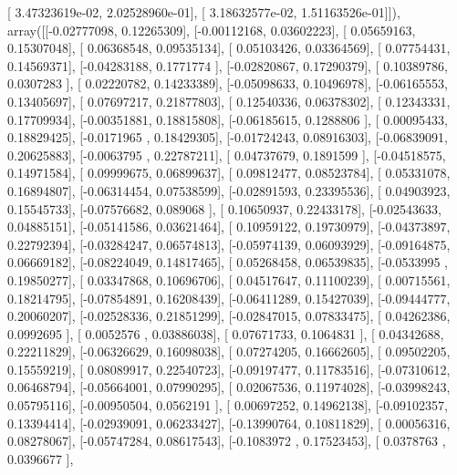 \documentclass{article}
\begin{document}
       [  3.47323619e-02,   2.02528960e-01],
       [  3.18632577e-02,   1.51163526e-01]]), array([[-0.02777098,  0.12265309],
       [-0.00112168,  0.03602223],
       [ 0.05659163,  0.15307048],
       [ 0.06368548,  0.09535134],
       [ 0.05103426,  0.03364569],
       [ 0.07754431,  0.14569371],
       [-0.04283188,  0.1771774 ],
       [-0.02820867,  0.17290379],
       [ 0.10389786,  0.0307283 ],
       [ 0.02220782,  0.14233389],
       [-0.05098633,  0.10496978],
       [-0.06165553,  0.13405697],
       [ 0.07697217,  0.21877803],
       [ 0.12540336,  0.06378302],
       [ 0.12343331,  0.17709934],
       [-0.00351881,  0.18815808],
       [-0.06185615,  0.1288806 ],
       [ 0.00095433,  0.18829425],
       [-0.0171965 ,  0.18429305],
       [-0.01724243,  0.08916303],
       [-0.06839091,  0.20625883],
       [-0.0063795 ,  0.22787211],
       [ 0.04737679,  0.1891599 ],
       [-0.04518575,  0.14971584],
       [ 0.09999675,  0.06899637],
       [ 0.09812477,  0.08523784],
       [ 0.05331078,  0.16894807],
       [-0.06314454,  0.07538599],
       [-0.02891593,  0.23395536],
       [ 0.04903923,  0.15545733],
       [-0.07576682,  0.089068  ],
       [ 0.10650937,  0.22433178],
       [-0.02543633,  0.04885151],
       [-0.05141586,  0.03621464],
       [ 0.10959122,  0.19730979],
       [-0.04373897,  0.22792394],
       [-0.03284247,  0.06574813],
       [-0.05974139,  0.06093929],
       [-0.09164875,  0.06669182],
       [-0.08224049,  0.14817465],
       [ 0.05268458,  0.06539835],
       [-0.0533995 ,  0.19850277],
       [ 0.03347868,  0.10696706],
       [ 0.04517647,  0.11100239],
       [ 0.00715561,  0.18214795],
       [-0.07854891,  0.16208439],
       [-0.06411289,  0.15427039],
       [-0.09444777,  0.20060207],
       [-0.02528336,  0.21851299],
       [-0.02847015,  0.07833475],
       [ 0.04262386,  0.0992695 ],
       [ 0.0052576 ,  0.03886038],
       [ 0.07671733,  0.1064831 ],
       [ 0.04342688,  0.22211829],
       [-0.06326629,  0.16098038],
       [ 0.07274205,  0.16662605],
       [ 0.09502205,  0.15559219],
       [ 0.08089917,  0.22540723],
       [-0.09197477,  0.11783516],
       [-0.07310612,  0.06468794],
       [-0.05664001,  0.07990295],
       [ 0.02067536,  0.11974028],
       [-0.03998243,  0.05795116],
       [-0.00950504,  0.0562191 ],
       [ 0.00697252,  0.14962138],
       [-0.09102357,  0.13394414],
       [-0.02939091,  0.06233427],
       [-0.13990764,  0.10811829],
       [ 0.00056316,  0.08278067],
       [-0.05747284,  0.08617543],
       [-0.1083972 ,  0.17523453],
       [ 0.0378763 ,  0.0396677 ],
\end{document}
